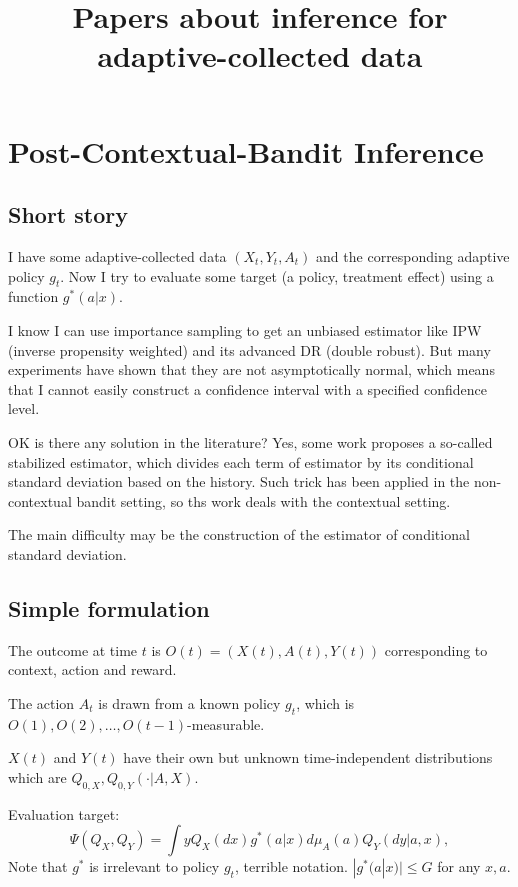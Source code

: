 \documentclass{article}
\title{Papers about inference for adaptive-collected data }
\begin{document}
\maketitle

\section{Post-Contextual-Bandit Inference}
\subsection{Short story}
I have some adaptive-collected data $(X_t,Y_t,A_t)$ and the corresponding adaptive policy $g_t$. 
Now I try to evaluate some target (a policy, treatment effect) using a function $g^*(a|x)$. 

I know I can use importance sampling to get an unbiased estimator like IPW (inverse propensity weighted) and its advanced DR (double robust).
But many experiments have shown that they are not asymptotically normal, which means that I cannot easily construct a confidence interval 
with a specified confidence level.

OK is there any solution in the literature? Yes, some work proposes a so-called stabilized estimator, 
which divides each term of estimator by its conditional standard deviation based on the history.
Such trick has been applied in the non-contextual bandit setting, so ths work deals with the contextual setting.

The main difficulty may be the construction of the estimator of conditional standard deviation.

\subsection{Simple formulation}
The outcome at time $t$ is $O(t)=(X(t),A(t),Y(t))$ corresponding to context, action and reward.

The action $A_t$ is drawn from a known policy $g_t$, which is $O(1),O(2),\dots,O(t-1)$-measurable.

$X(t)$ and $Y(t)$ have their own but unknown time-independent distributions which are $Q_{0,X}, Q_{0,Y}(\cdot|A,X)$.

Evaluation target:
\begin{equation}
    \Psi(Q_X,Q_Y)=\int y Q_X(dx) g^*(a|x) d\mu_A(a) Q_Y(dy|a,x),
\end{equation}
Note that $g^*$ is irrelevant to policy $g_t$, terrible notation. $|g^*(a|x)| \leq G$ for any $x,a$.
\end{document}
